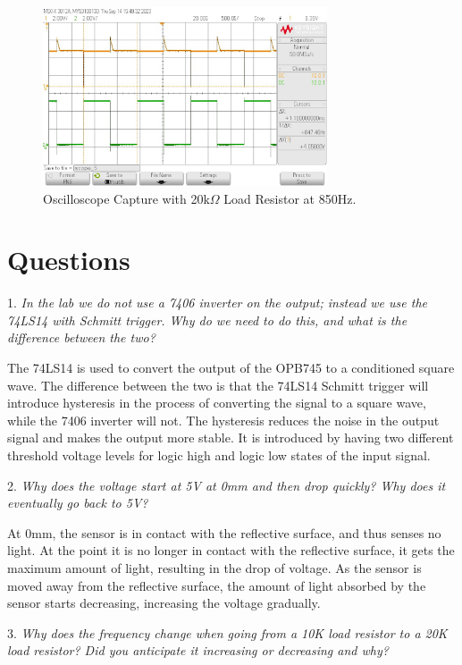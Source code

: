 \documentclass[CMPE]{KGCOEReport}
\begin{document}
\begin{figure}[H]
    \centering
    \includegraphics[width=0.75\textwidth]{output_max_20.png}
    \caption{Oscilloscope Capture with 20k$\Omega$ Load Resistor at 850Hz.}
    \label{fig:osc_20_max}
\end{figure}

\section*{Questions}

1. \emph{In the lab we do not use a 7406 inverter on the output; instead we use the 74LS14 with Schmitt trigger. Why do we need to do this, and what is the difference between the two?}

The 74LS14 is used to convert the output of the OPB745 to a conditioned square wave. The difference between the two is that the 74LS14 Schmitt trigger will introduce hysteresis in the process of converting the signal to a square wave, while the 7406 inverter will not. The hysteresis reduces the noise in the output signal and makes the output more stable. It is introduced by having two different threshold voltage levels for logic high and logic low states of the input signal.
\bigskip

2. \emph{Why does the voltage start at 5V at 0mm and then drop quickly? Why does it eventually go back to 5V?}

At 0mm, the sensor is in contact with the reflective surface, and thus senses no light. At the point it is no longer in contact with the reflective surface, it gets the maximum amount of light, resulting in the drop of voltage. As the sensor is moved away from the reflective surface, the amount of light absorbed by the sensor starts decreasing, increasing the voltage gradually.
\bigskip

3. \emph{Why does the frequency change when going from a 10K load resistor to a 20K load resistor? Did you anticipate it increasing or decreasing and why?}
\end{document}

